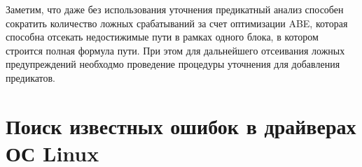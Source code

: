 Заметим, что даже без использования уточнения предикатный анализ способен сократить количество ложных срабатываний за счет оптимизации ABE, которая способна отсекать недостижимые пути в рамках одного блока, в котором строится полная формула пути.
При этом для дальнейшего отсеивания ложных предупреждений необходмо проведение процедуры уточнения для добавления предикатов.

\section{Поиск известных ошибок в драйверах ОС Linux}









